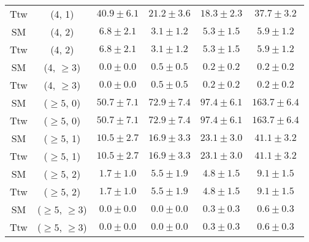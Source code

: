 \begin{table}[h!]
{\begin{tabular}{cccccc}
	Ttw & (4, 1) & $40.9\pm 6.1$ & $21.2\pm 3.6$ & $18.3\pm 2.3$ & $37.7\pm 3.2$ \\[0.5ex] 
	SM & (4, 2) & $6.8\pm 2.1$ & $3.1\pm 1.2$ & $5.3\pm 1.5$ & $5.9\pm 1.2$ \\[0.5ex] 
	Ttw & (4, 2) & $6.8\pm 2.1$ & $3.1\pm 1.2$ & $5.3\pm 1.5$ & $5.9\pm 1.2$ \\[0.5ex] 
	SM & (4, $\ge3$) & $0.0\pm 0.0$ & $0.5\pm 0.5$ & $0.2\pm 0.2$ & $0.2\pm 0.2$ \\[0.5ex] 
	Ttw & (4, $\ge3$) & $0.0\pm 0.0$ & $0.5\pm 0.5$ & $0.2\pm 0.2$ & $0.2\pm 0.2$ \\[0.5ex] 
	SM & ($\ge5$, 0) & $50.7\pm 7.1$ & $72.9\pm 7.4$ & $97.4\pm 6.1$ & $163.7\pm 6.4$ \\[0.5ex] 
	Ttw & ($\ge5$, 0) & $50.7\pm 7.1$ & $72.9\pm 7.4$ & $97.4\pm 6.1$ & $163.7\pm 6.4$ \\[0.5ex] 
	SM & ($\ge5$, 1) & $10.5\pm 2.7$ & $16.9\pm 3.3$ & $23.1\pm 3.0$ & $41.1\pm 3.2$ \\[0.5ex] 
	Ttw & ($\ge5$, 1) & $10.5\pm 2.7$ & $16.9\pm 3.3$ & $23.1\pm 3.0$ & $41.1\pm 3.2$ \\[0.5ex] 
	SM & ($\ge5$, 2) & $1.7\pm 1.0$ & $5.5\pm 1.9$ & $4.8\pm 1.5$ & $9.1\pm 1.5$ \\[0.5ex] 
	Ttw & ($\ge5$, 2) & $1.7\pm 1.0$ & $5.5\pm 1.9$ & $4.8\pm 1.5$ & $9.1\pm 1.5$ \\[0.5ex] 
	SM & ($\ge5$, $\ge3$) & $0.0\pm 0.0$ & $0.0\pm 0.0$ & $0.3\pm 0.3$ & $0.6\pm 0.3$ \\[0.5ex] 
	Ttw & ($\ge5$, $\ge3$) & $0.0\pm 0.0$ & $0.0\pm 0.0$ & $0.3\pm 0.3$ & $0.6\pm 0.3$ \\[0.5ex] 
	\hline
	\hline
\end{tabular}}
\end{table}
